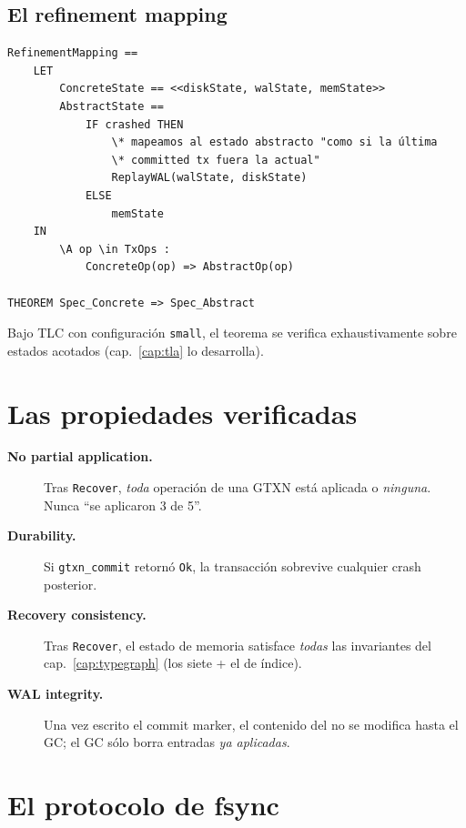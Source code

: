 \subsection*{El refinement mapping}

\begin{lstlisting}[language=tla, caption={Mapping de refinement
concreto $\to$ abstracto.}, label={lst:tla-refinement}]
RefinementMapping ==
    LET
        ConcreteState == <<diskState, walState, memState>>
        AbstractState ==
            IF crashed THEN
                \* mapeamos al estado abstracto "como si la última
                \* committed tx fuera la actual"
                ReplayWAL(walState, diskState)
            ELSE
                memState
    IN
        \A op \in TxOps :
            ConcreteOp(op) => AbstractOp(op)

THEOREM Spec_Concrete => Spec_Abstract
\end{lstlisting}

Bajo TLC con configuración \texttt{small}, el teorema se verifica
exhaustivamente sobre estados acotados (cap.~\ref{cap:tla} lo desarrolla).

\section{Las propiedades verificadas}

\begin{description}
  \item[\textbf{No partial application.}] Tras \texttt{Recover},
    \emph{toda} operación de una GTXN está aplicada o \emph{ninguna}.
    Nunca ``se aplicaron 3 de 5''.
  \item[\textbf{Durability.}] Si \texttt{gtxn\_commit} retornó
    \texttt{Ok}, la transacción sobrevive cualquier crash posterior.
  \item[\textbf{Recovery consistency.}] Tras \texttt{Recover}, el estado
    de memoria satisface \emph{todas} las invariantes del
    cap.~\ref{cap:typegraph} (los siete + el de índice).
  \item[\textbf{WAL integrity.}] Una vez escrito el commit marker, el
    contenido del \wal{} no se modifica hasta el GC; el GC sólo borra
    entradas \emph{ya aplicadas}.
\end{description}

\section{El protocolo de fsync}

